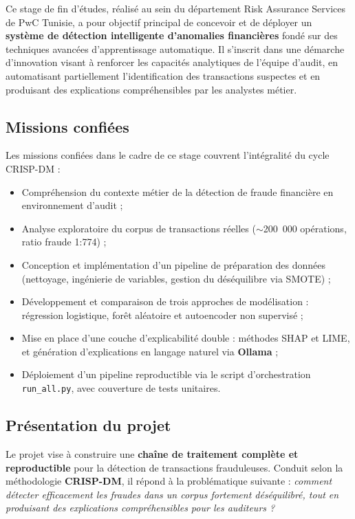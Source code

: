 Ce stage de fin d'études, réalisé au sein du département Risk Assurance Services de PwC
Tunisie, a pour objectif principal de concevoir et de déployer un \textbf{système de
détection intelligente d'anomalies financières} fondé sur des techniques avancées
d'apprentissage automatique. Il s'inscrit dans une démarche d'innovation visant à renforcer
les capacités analytiques de l'équipe d'audit, en automatisant partiellement l'identification
des transactions suspectes et en produisant des explications compréhensibles par les
analystes métier.

\subsection{Missions confiées}

Les missions confiées dans le cadre de ce stage couvrent l'intégralité du cycle CRISP-DM :

\begin{itemize}
  \item Compréhension du contexte métier de la détection de fraude financière en
    environnement d'audit ;
  \item Analyse exploratoire du corpus de transactions réelles
    ($\sim$200~000 opérations, ratio fraude 1:774) ;
  \item Conception et implémentation d'un pipeline de préparation des données
    (nettoyage, ingénierie de variables, gestion du déséquilibre via SMOTE) ;
  \item Développement et comparaison de trois approches de modélisation : régression
    logistique, forêt aléatoire et autoencoder non supervisé ;
  \item Mise en place d'une couche d'explicabilité double : méthodes SHAP et LIME, et
    génération d'explications en langage naturel via \textbf{Ollama} ;
  \item Déploiement d'un pipeline reproductible via le script d'orchestration
    \texttt{run\_all.py}, avec couverture de tests unitaires.
\end{itemize}

\subsection{Présentation du projet}

Le projet vise à construire une \textbf{chaîne de traitement complète et reproductible} pour
la détection de transactions frauduleuses. Conduit selon la méthodologie \textbf{CRISP-DM},
il répond à la problématique suivante : \textit{comment détecter efficacement les fraudes
dans un corpus fortement déséquilibré, tout en produisant des explications compréhensibles
pour les auditeurs ?}

